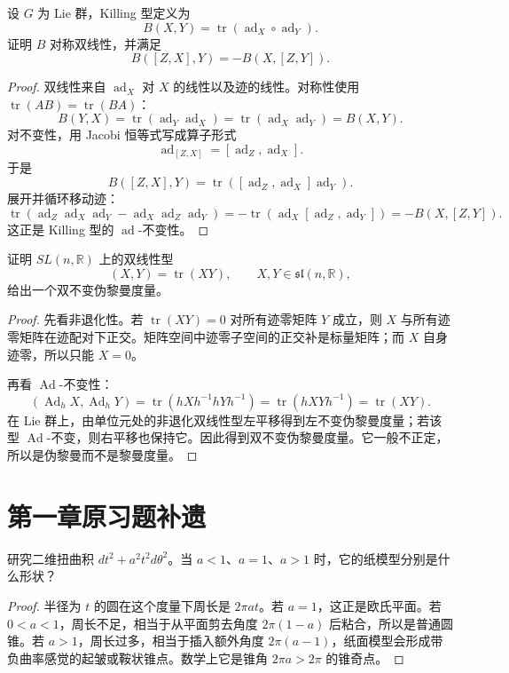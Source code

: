 \documentclass[11pt,a4paper,openany]{ctexbook}
\numberwithin{equation}{chapter}
\begin{document}
\begin{problem}
设 \(G\) 为 Lie 群，Killing 型定义为
\[
B(X,Y)=\operatorname{tr}(\operatorname{ad}_X\circ\operatorname{ad}_Y).
\]
证明 \(B\) 对称双线性，并满足
\[
B([Z,X],Y)=-B(X,[Z,Y]).
\]
\end{problem}
\begin{proof}
双线性来自 \(\operatorname{ad}_X\) 对 \(X\) 的线性以及迹的线性。对称性使用 \(\operatorname{tr}(AB)=\operatorname{tr}(BA)\)：
\[
B(Y,X)=\operatorname{tr}(\operatorname{ad}_Y\operatorname{ad}_X)
=\operatorname{tr}(\operatorname{ad}_X\operatorname{ad}_Y)=B(X,Y).
\]
对不变性，用 Jacobi 恒等式写成算子形式
\[
\operatorname{ad}_{[Z,X]}=[\operatorname{ad}_Z,\operatorname{ad}_X].
\]
于是
\[
B([Z,X],Y)=\operatorname{tr}([\operatorname{ad}_Z,\operatorname{ad}_X]\operatorname{ad}_Y).
\]
展开并循环移动迹：
\[
\operatorname{tr}(\operatorname{ad}_Z\operatorname{ad}_X\operatorname{ad}_Y-\operatorname{ad}_X\operatorname{ad}_Z\operatorname{ad}_Y)
=-\operatorname{tr}(\operatorname{ad}_X[\operatorname{ad}_Z,\operatorname{ad}_Y])
=-B(X,[Z,Y]).
\]
这正是 Killing 型的 \(\operatorname{ad}\)-不变性。
\end{proof}

\begin{problem}
证明 \(SL(n,\mathbb R)\) 上的双线性型
\[
(X,Y)=\operatorname{tr}(XY),\qquad X,Y\in\mathfrak{sl}(n,\mathbb R),
\]
给出一个双不变伪黎曼度量。
\end{problem}
\begin{proof}
先看非退化性。若 \(\operatorname{tr}(XY)=0\) 对所有迹零矩阵 \(Y\) 成立，则 \(X\) 与所有迹零矩阵在迹配对下正交。矩阵空间中迹零子空间的正交补是标量矩阵；而 \(X\) 自身迹零，所以只能 \(X=0\)。

再看 \(\operatorname{Ad}\)-不变性：
\[
(\operatorname{Ad}_hX,\operatorname{Ad}_hY)
=\operatorname{tr}(hXh^{-1}hYh^{-1})
=\operatorname{tr}(hXYh^{-1})
=\operatorname{tr}(XY).
\]
在 Lie 群上，由单位元处的非退化双线性型左平移得到左不变伪黎曼度量；若该型 \(\operatorname{Ad}\)-不变，则右平移也保持它。因此得到双不变伪黎曼度量。它一般不正定，所以是伪黎曼而不是黎曼度量。
\end{proof}


\section{第一章原习题补遗}

\begin{problem}
研究二维扭曲积 \(dt^2+a^2t^2d\theta^2\)。当 \(a<1\)、\(a=1\)、\(a>1\) 时，它的纸模型分别是什么形状？
\end{problem}
\begin{proof}
半径为 \(t\) 的圆在这个度量下周长是 \(2\pi at\)。若 \(a=1\)，这正是欧氏平面。若 \(0<a<1\)，周长不足，相当于从平面剪去角度 \(2\pi(1-a)\) 后粘合，所以是普通圆锥。若 \(a>1\)，周长过多，相当于插入额外角度 \(2\pi(a-1)\)，纸面模型会形成带负曲率感觉的起皱或鞍状锥点。数学上它是锥角 \(2\pi a>2\pi\) 的锥奇点。
\end{proof}
\end{document}
